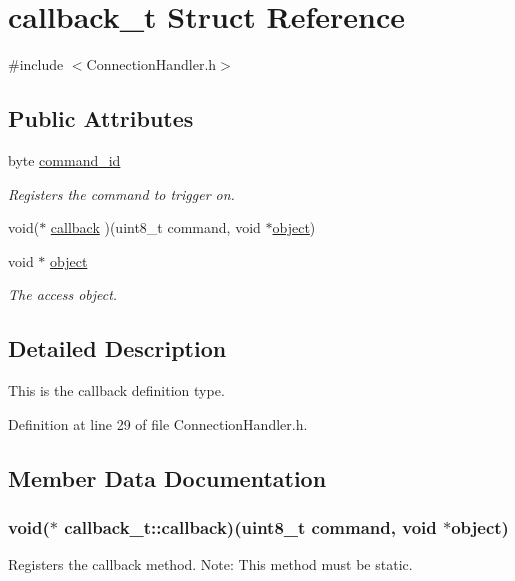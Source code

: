 \hypertarget{structcallback__t}{\section{callback\-\_\-t \-Struct \-Reference}
\label{structcallback__t}
}


{\ttfamily \#include $<$\-Connection\-Handler.\-h$>$}

\subsection*{\-Public \-Attributes}
\begin{DoxyCompactItemize}
\item 
byte \hyperlink{structcallback__t_ada2c0e2a936e49f0ece582c40953c278}{command\-\_\-id}
\begin{DoxyCompactList}\small\item\em \-Registers the command to trigger on. \end{DoxyCompactList}\item 
void($\ast$ \hyperlink{structcallback__t_a9d48eeac6fd6f90eb5d053b30074cc7b}{callback} )(uint8\-\_\-t command, void $\ast$\hyperlink{structcallback__t_a30ed93032c0a2ead09070156d7c37790}{object})
\item 
void $\ast$ \hyperlink{structcallback__t_a30ed93032c0a2ead09070156d7c37790}{object}
\begin{DoxyCompactList}\small\item\em \-The access object. \end{DoxyCompactList}\end{DoxyCompactItemize}


\subsection{\-Detailed \-Description}
\-This is the callback definition type. 

\-Definition at line 29 of file \-Connection\-Handler.\-h.



\subsection{\-Member \-Data \-Documentation}
\hypertarget{structcallback__t_a9d48eeac6fd6f90eb5d053b30074cc7b}{
\subsubsection[{callback}]{\setlength{\rightskip}{0pt plus 5cm}void($\ast$ {\bf callback\-\_\-t\-::callback})(uint8\-\_\-t command, void $\ast${\bf object})}}\label{structcallback__t_a9d48eeac6fd6f90eb5d053b30074cc7b}
\-Registers the callback method. \-Note\-: \-This method must be static. 

